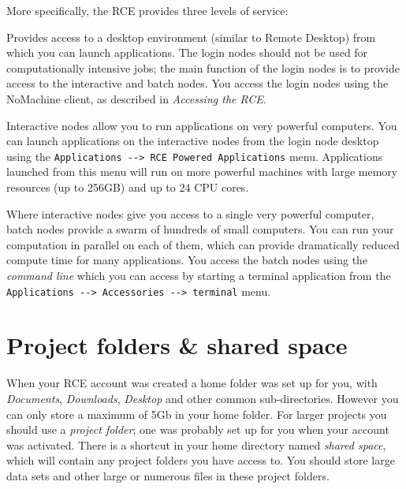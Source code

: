 \documentclass[
]{book}
\providecommand{\tightlist}{%
  \setlength{\itemsep}{0pt}\setlength{\parskip}{0pt}}
\begin{document}
More specifically, the RCE provides three levels of service:

\begin{description}
\tightlist
\item[\textbf{Login nodes}]
Provides access to a desktop environment (similar to Remote Desktop)
from which you can launch applications. The login nodes should not
be used for computationally intensive jobs; the main function of the
login nodes is to provide access to the interactive and batch nodes.
You access the login nodes using the NoMachine client, as described
in \emph{Accessing the RCE}.
\item[\textbf{Interactive nodes}]
Interactive nodes allow you to run applications on very powerful
computers. You can launch applications on the interactive nodes from
the login node desktop using the
\texttt{Applications\ -\/-\textgreater{}\ RCE\ Powered\ Applications} menu. Applications
launched from this menu will run on more powerful machines with
large memory resources (up to 256GB) and up to 24 CPU cores.
\item[\textbf{Batch nodes}]
Where interactive nodes give you access to a single very powerful
computer, batch nodes provide a swarm of hundreds of small
computers. You can run your computation in parallel on each of them,
which can provide dramatically reduced compute time for many
applications. You access the batch nodes using the \emph{command line}
which you can access by starting a terminal application from the
\texttt{Applications\ -\/-\textgreater{}\ Accessories\ -\/-\textgreater{}\ terminal} menu.
\end{description}

\hypertarget{project-folders-shared-space}{%
\section{Project folders \& shared space}\label{project-folders-shared-space}}

When your RCE account was created a home folder was set up for you, with
\emph{Documents}, \emph{Downloads}, \emph{Desktop} and other common sub-directories.
However you can only store a maximum of 5Gb in your home folder. For
larger projects you should use a \emph{project folder}; one was probably set
up for you when your account was activated. There is a shortcut in your
home directory named \emph{shared space}, which will contain any project
folders you have access to. You should store large data sets and other
large or numerous files in these project folders.
\end{document}
